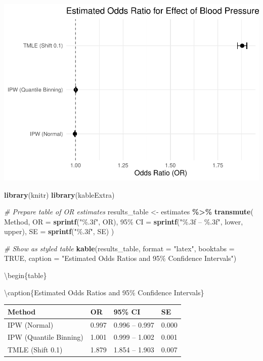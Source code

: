 \documentclass[
]{article}
\newenvironment{Shaded}{\begin{snugshade}}{\end{snugshade}}
\newcommand{\AttributeTok}[1]{\textcolor[rgb]{0.13,0.29,0.53}{#1}}
\newcommand{\CommentTok}[1]{\textcolor[rgb]{0.56,0.35,0.01}{\textit{#1}}}
\newcommand{\ConstantTok}[1]{\textcolor[rgb]{0.56,0.35,0.01}{#1}}
\newcommand{\FunctionTok}[1]{\textcolor[rgb]{0.13,0.29,0.53}{\textbf{#1}}}
\newcommand{\NormalTok}[1]{#1}
\newcommand{\OtherTok}[1]{\textcolor[rgb]{0.56,0.35,0.01}{#1}}
\newcommand{\SpecialCharTok}[1]{\textcolor[rgb]{0.81,0.36,0.00}{\textbf{#1}}}
\newcommand{\StringTok}[1]{\textcolor[rgb]{0.31,0.60,0.02}{#1}}
\begin{document}
\includegraphics{rhc_analysis_files/figure-latex/forest-plot-or-1.pdf}

\begin{Shaded}
\begin{Highlighting}[]
\FunctionTok{library}\NormalTok{(knitr)}
\FunctionTok{library}\NormalTok{(kableExtra)}

\CommentTok{\# Prepare table of OR estimates}
\NormalTok{results\_table }\OtherTok{\textless{}{-}}\NormalTok{ estimates }\SpecialCharTok{\%\textgreater{}\%}
  \FunctionTok{transmute}\NormalTok{(}
\NormalTok{    Method,}
    \AttributeTok{OR =} \FunctionTok{sprintf}\NormalTok{(}\StringTok{"\%.3f"}\NormalTok{, OR),}
    \StringTok{\textasciigrave{}}\AttributeTok{95\% CI}\StringTok{\textasciigrave{}} \OtherTok{=} \FunctionTok{sprintf}\NormalTok{(}\StringTok{"\%.3f – \%.3f"}\NormalTok{, lower, upper),}
    \AttributeTok{SE =} \FunctionTok{sprintf}\NormalTok{(}\StringTok{"\%.3f"}\NormalTok{, SE)}
\NormalTok{  )}

\CommentTok{\# Show as styled table}
\FunctionTok{kable}\NormalTok{(results\_table, }\AttributeTok{format =} \StringTok{"latex"}\NormalTok{, }\AttributeTok{booktabs =} \ConstantTok{TRUE}\NormalTok{, }\AttributeTok{caption =} \StringTok{"Estimated Odds Ratios and 95\% Confidence Intervals"}\NormalTok{)}
\end{Highlighting}
\end{Shaded}

\textbackslash begin\{table\}

\textbackslash caption\{\label{tab:results-table}Estimated Odds Ratios
and 95\% Confidence Intervals\} \centering

\begin{tabular}[t]{llll}
\toprule
Method & OR & 95\% CI & SE\\
\midrule
IPW (Normal) & 0.997 & 0.996 – 0.997 & 0.000\\
IPW (Quantile Binning) & 1.001 & 0.999 – 1.002 & 0.001\\
TMLE (Shift 0.1) & 1.879 & 1.854 – 1.903 & 0.007\\
\bottomrule
\end{tabular}
\end{document}
